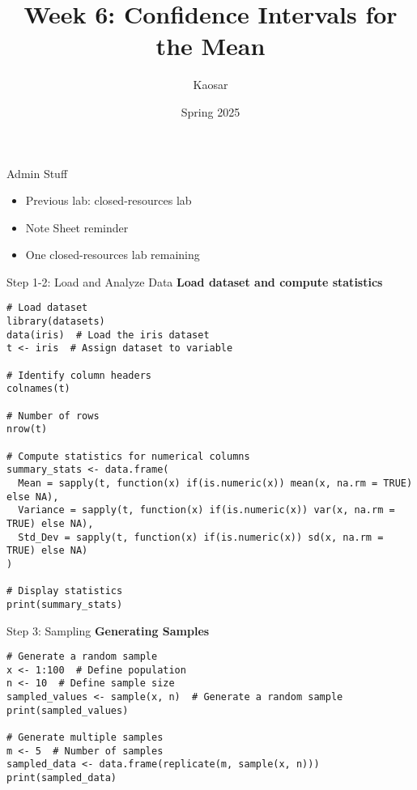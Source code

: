 \documentclass{beamer}
\title{Week 6: Confidence Intervals for the Mean}
\author{Kaosar}
\institute{Auburn University}
\date{Spring 2025}
\begin{document}
\frame{\titlepage}

\begin{frame}{Admin Stuff}
    \begin{itemize}
        \item Previous lab: closed-resources lab
        \item Note Sheet reminder
        \item One closed-resources lab remaining
    \end{itemize}
\end{frame}

\begin{frame}{Step 1-2: Load and Analyze Data}
    \textbf{Load dataset and compute statistics}
    \begin{tcolorbox}[title=R Code]
\begin{verbatim}
# Load dataset
library(datasets)
data(iris)  # Load the iris dataset
t <- iris  # Assign dataset to variable

# Identify column headers
colnames(t)

# Number of rows
nrow(t)

# Compute statistics for numerical columns
summary_stats <- data.frame(
  Mean = sapply(t, function(x) if(is.numeric(x)) mean(x, na.rm = TRUE) else NA),
  Variance = sapply(t, function(x) if(is.numeric(x)) var(x, na.rm = TRUE) else NA),
  Std_Dev = sapply(t, function(x) if(is.numeric(x)) sd(x, na.rm = TRUE) else NA)
)

# Display statistics
print(summary_stats)
\end{verbatim}
    \end{tcolorbox}
\end{frame}

\begin{frame}{Step 3: Sampling}
    \textbf{Generating Samples}
    \begin{tcolorbox}[title=R Code]
\begin{verbatim}
# Generate a random sample
x <- 1:100  # Define population
n <- 10  # Define sample size
sampled_values <- sample(x, n)  # Generate a random sample
print(sampled_values)

# Generate multiple samples
m <- 5  # Number of samples
sampled_data <- data.frame(replicate(m, sample(x, n)))
print(sampled_data)
\end{verbatim}
    \end{tcolorbox}
\end{frame}
\end{document}
